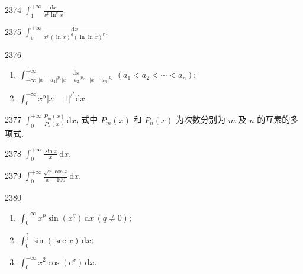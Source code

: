 \begin{prob}[S]{2374}
$\displaystyle\int_1^{+\infty} \frac{\mathrm{d}x}{x^p \ln^q x}$.
\end{prob}

\begin{prob}[S]{2375}
$\displaystyle\int_{\mathrm{e}}^{+\infty} \frac{\mathrm{d}x}{x^p (\ln x)^q (\ln \ln x)^r}$.
\end{prob}

\begin{prob}[M]{2376}
\begin{enumerate}[label=(\alph*), itemsep=2pt, topsep=3pt]
\item $\displaystyle\int_{-\infty}^{+\infty} \frac{\mathrm{d}x}{|x - a_1|^{p_1} |x - a_2|^{p_2} \cdots |x - a_n|^{p_n}}\ (a_1 < a_2 < \cdots < a_n)$;
\item $\displaystyle\int_0^{+\infty} x^\alpha |x - 1|^\beta\,\mathrm{d}x$.
\end{enumerate}
\end{prob}

\begin{prob}[M]{2377}
$\displaystyle\int_0^{+\infty} \frac{P_m(x)}{P_n(x)}\,\mathrm{d}x$, 式中 $P_m(x)$ 和 $P_n(x)$ 为次数分别为 $m$ 及 $n$ 的互素的多项式.
\end{prob}


\begin{prob}[S]{2378}
$\displaystyle\int_0^{+\infty} \frac{\sin x}{x}\,\mathrm{d}x$. 
\end{prob}

\begin{prob}[S]{2379}
$\displaystyle\int_0^{+\infty} \frac{\sqrt{x} \cos x}{x + 100}\,\mathrm{d}x$.
\end{prob}

\begin{prob}[L]{2380}
\begin{enumerate}[label=(\alph*), itemsep=2pt, topsep=3pt]
\item $\displaystyle\int_0^{+\infty} x^p \sin(x^q)\,\mathrm{d}x\ (q \neq 0)$;
\item $\displaystyle\int_0^{\frac{\pi}{2}} \sin(\sec x)\,\mathrm{d}x$;
\item $\displaystyle\int_0^{+\infty} x^2 \cos(\mathrm{e}^x)\,\mathrm{d}x$.
\end{enumerate}
\end{prob}

